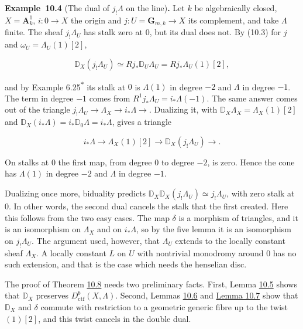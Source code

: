 \documentclass[11pt]{article}
\newenvironment{bpstatement}[2]{\par\addvspace{0.6\baselineskip}\noindent\textbf{#1}#2\textbf{.}\enspace\ignorespaces}
  {\par\addvspace{0.4\baselineskip}}
\newcommand{\bpout}[1]{#1\textsuperscript{\hyperlink{bp-outside}{\ensuremath{\ast}}}}
\begin{document}
\label{bp114}%
\begin{bpstatement}{Example~10.4}{ (The dual of $j_!\Lambda$ on the line)}
Let \(k\) be algebraically closed, \(X=\mathbf A^1_k\), \(i:0\to X\) the origin and \(j:U=\mathbf G_{m,k}\to X\) its complement, and take \(\Lambda\) finite. The sheaf \(j_!\Lambda_U\) has stalk zero at \(0\), but its dual does not. By (10.3) for \(j\) and \(\omega_U=\Lambda_U(1)[2]\),

\[
\mathbb D_X(j_!\Lambda_U)\simeq Rj_*\mathbb D_U\Lambda_U
=Rj_*\Lambda_U(1)[2],
\]

and by Example \bpout{6.25} its stalk at \(0\) is \(\Lambda(1)\) in degree \(-2\) and \(\Lambda\) in degree \(-1\). The term in degree \(-1\) comes from \(R^1j_*\Lambda_U=i_*\Lambda(-1)\). The same answer comes out of the triangle \(j_!\Lambda_U\to\Lambda_X\to i_*\Lambda\to\). Dualizing it, with \(\mathbb D_X\Lambda_X=\Lambda_X(1)[2]\) and \(\mathbb D_X(i_*\Lambda)=i_*\mathbb D_0\Lambda=i_*\Lambda\), gives a triangle

\[
i_*\Lambda\longrightarrow\Lambda_X(1)[2]\longrightarrow
\mathbb D_X(j_!\Lambda_U)\longrightarrow.
\]

On stalks at \(0\) the first map, from degree \(0\) to degree \(-2\), is zero. Hence the cone has \(\Lambda(1)\) in degree \(-2\) and \(\Lambda\) in degree \(-1\).

Dualizing once more, biduality predicts \(\mathbb D_X\mathbb D_X(j_!\Lambda_U)
\simeq j_!\Lambda_U\), with zero stalk at \(0\). In other words, the second dual cancels the stalk that the first created. Here this follows from the two easy cases. The map \(\delta\) is a morphism of triangles, and it is an isomorphism on \(\Lambda_X\) and on \(i_*\Lambda\), so by the five lemma it is an isomorphism on \(j_!\Lambda_U\). The argument used, however, that \(\Lambda_U\) extends to the locally constant sheaf \(\Lambda_X\). A locally constant \(L\) on \(U\) with nontrivial monodromy around \(0\) has no such extension, and that is the case which needs the henselian disc.
\end{bpstatement}

\label{bp115}%
The proof of Theorem \hyperref[bp125]{10.8} needs two preliminary facts. First, Lemma \hyperref[bp116]{10.5} shows that \(\mathbb D_X\) preserves \(D^b_{\mathrm{ctf}}(X,\Lambda)\). Second, Lemmas \hyperref[bp119]{10.6} and \hyperref[bp122]{Lemma 10.7} show that \(\mathbb D_X\) and \(\delta\) commute with restriction to a geometric generic fibre up to the twist \((1)[2]\), and this twist cancels in the double dual.
\end{document}

